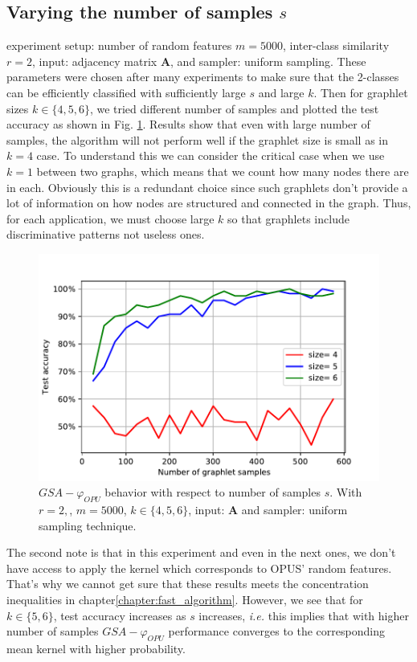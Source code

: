 \subsection{Varying the number of samples $s$}
experiment setup: number of random features $m=5000$, inter-class similarity $r=2$, input: adjacency matrix $\mathbf{A}$, and sampler: uniform sampling. These parameters were chosen after many experiments to make sure that the 2-classes can be efficiently classified with sufficiently large $s$ and large $k$. Then for graphlet sizes $k\in\{4,5,6\}$, we tried different number of samples and plotted the test accuracy as shown in Fig. \ref{fig:varying_samples_num}.\newline
Results show that even with large number of samples, the algorithm will not perform well if the graphlet size is small as in $k=4$ case. To understand this we can consider the critical case when we use $k=1$ between two graphs, which means that we count how many nodes there are in each. Obviously this is a redundant choice since such graphlets don't provide a lot of information on how nodes are structured and connected in the graph. Thus, for each application, we must choose large $k$ so that graphlets include discriminative patterns not useless ones.
\begin{figure}[H]
\centering
\includegraphics[scale=0.5]{Dissertation/figs/samples_num.pdf}
\caption[$GSA-\varphi_{OPU}$ behavior with respect to number of samples $s$]{$GSA-\varphi_{OPU}$ behavior with respect to number of samples $s$. With $r=2,$, $m=5000$, $k\in\{4,5,6\}$, input: $\mathbf{A}$ and sampler: uniform sampling technique.}
\label{fig:varying_samples_num}
\end{figure}
The second note is that in this experiment and even in the next ones, we don't have access to apply the kernel which corresponds to OPUS' random features. That's why we cannot get sure that these results meets the concentration inequalities in chapter\ref{chapter:fast_algorithm}. However, we see that for $k\in\{5,6\}$, test accuracy increases as  $s$ increases, \emph{i.e.} this implies that with higher number of samples $GSA-\varphi_{OPU}$ performance converges to the corresponding mean kernel with higher probability.




